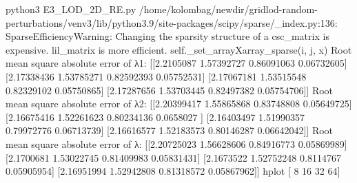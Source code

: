 python3 E3_LOD_2D_RE.py
/home/kolombag/newdir/gridlod-random-perturbations/venv3/lib/python3.9/site-packages/scipy/sparse/_index.py:136: SparseEfficiencyWarning: Changing the sparsity structure of a csc_matrix is expensive. lil_matrix is more efficient.
  self._set_arrayXarray_sparse(i, j, x)
Root mean square absolute error of λ1:
 [[2.2105087  1.57392727 0.86091063 0.06732605]
 [2.17338436 1.53785271 0.82592393 0.05752531]
 [2.17067181 1.53515548 0.82329102 0.05750865]
 [2.17287656 1.53703445 0.82497382 0.05754706]]
Root mean square absolute error of λ2: 
 [[2.20399417 1.55865868 0.83748808 0.05649725]
 [2.16675416 1.52261623 0.80234136 0.0658027 ]
 [2.16403497 1.51990357 0.79972776 0.06713739]
 [2.16616577 1.52183573 0.80146287 0.06642042]]
Root mean square absolute error of λ: 
 [[2.20725023 1.56628606 0.84916773 0.05869989]
 [2.1700681  1.53022745 0.81409983 0.05831431]
 [2.1673522  1.52752248 0.8114767  0.05905954]
 [2.16951994 1.52942808 0.81318572 0.05867962]]
hplot [ 8 16 32 64]